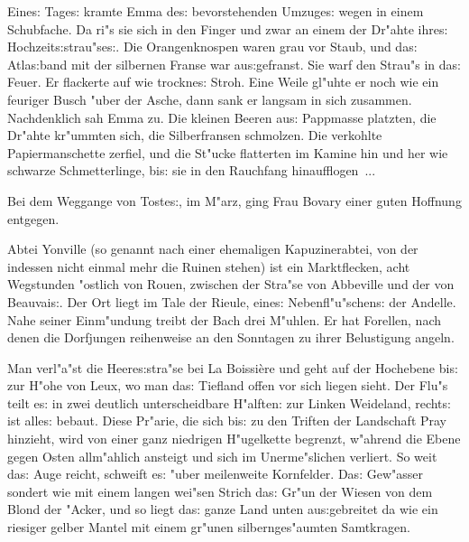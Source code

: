 \documentclass[oneside,12pt]{book}
\newcommand{\s}{s:}%
\begin{document}
Eine{\s} Tage{\s} kramte Emma de{\s} bevorstehenden Umzuge{\s}
wegen in einem Schubfache. Da ri"s sie sich in den Finger und zwar
an einem der Dr"ahte ihre{\s} Hochzeit{\s}strau"se{\s}. Die
Orangenknospen waren grau vor Staub, und da{\s} Atla{\s}band mit
der silbernen Franse war au{\s}gefranst. Sie warf den Strau"s in
da{\s} Feuer. Er flackerte auf wie trockne{\s} Stroh. Eine Weile
gl"uhte er noch wie ein feuriger Busch "uber der Asche, dann sank
er langsam in sich zusammen. Nachdenklich sah Emma zu. Die kleinen
Beeren au{\s} Pappmasse platzten, die Dr"ahte kr"ummten sich, die
Silberfransen schmolzen. Die verkohlte Papiermanschette zerfiel,
und die St"ucke flatterten im Kamine hin und her wie schwarze
Schmetterlinge, bi{\s} sie in den Rauchfang hinaufflogen~...

Bei dem Weggange von Toste{\s}, im M"arz, ging Frau Bovary einer
guten Hoffnung entgegen.


\newpage
\thispagestyle{empty}
\begin{center}
\vspace{5cm}
{\Huge \so{Zweite{\s} Bu{ch}}}
\end{center}


\newpage\begin{center}
{\large \so{Er{st}e{\s} Kapitel}}\bigskip\bigskip
\end{center}

Abtei Yonville (so genannt nach einer ehemaligen Kapuzinerabtei,
von der indessen nicht einmal mehr die Ruinen stehen) ist ein
Marktflecken, acht Wegstunden "ostlich von Rouen, zwischen der
Stra"se von Abbeville und der von Beauvai{\s}. Der Ort liegt im
Tale der Rieule, eine{\s} Nebenfl"u"schen{\s} der Andelle. Nahe
seiner Einm"undung treibt der Bach drei M"uhlen. Er hat Forellen,
nach denen die Dorfjungen reihenweise an den Sonntagen zu ihrer
Belustigung angeln.

Man verl"a"st die Heere{\s}stra"se bei La Boissi\`ere und geht auf
der Hochebene bi{\s} zur H"ohe von Leux, wo man da{\s} Tiefland
offen vor sich liegen sieht. Der Flu"s teilt e{\s} in zwei
deutlich unterscheidbare H"alften: zur Linken Weideland, recht{\s}
ist alle{\s} bebaut. Diese Pr"arie, die sich bi{\s} zu den Triften
der Landschaft Pray hinzieht, wird von einer ganz niedrigen
H"ugelkette begrenzt, w"ahrend die Ebene gegen Osten allm"ahlich
ansteigt und sich im Unerme"slichen verliert. So weit da{\s} Auge
reicht, schweift e{\s} "uber meilenweite Kornfelder. Da{\s}
Gew"asser sondert wie mit einem langen wei"sen Strich da{\s} Gr"un
der Wiesen von dem Blond der "Acker, und so liegt da{\s} ganze
Land unten au{\s}gebreitet da wie ein riesiger gelber Mantel mit
einem gr"unen silbernges"aumten Samtkragen.
\end{document}
